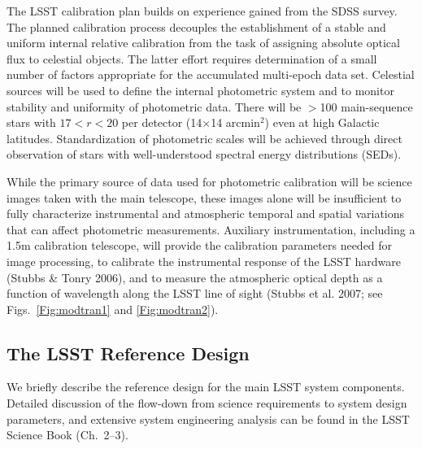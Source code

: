 \documentclass{emulateapj}
\begin{document}
The LSST calibration plan builds on experience gained from the SDSS survey. 
The planned calibration process decouples the establishment of a stable and uniform internal 
relative calibration from the task of assigning absolute optical flux to 
celestial objects. The latter effort requires determination of a small 
number of factors appropriate for the accumulated multi-epoch data set. 
Celestial sources will be used to define the internal photometric system and 
to monitor stability and uniformity of photometric data. There will be 
$>$100 main-sequence stars with $17<r<20$ per detector (14$\times$14 arcmin$^2$) 
even at high Galactic latitudes. Standardization of photometric scales will be 
achieved through direct observation of stars with well-understood spectral 
energy distributions (SEDs). 

While the primary source of data used for photometric calibration will be 
science images taken with the main telescope, these images alone will be 
insufficient to fully characterize instrumental and atmospheric temporal and 
spatial variations that can affect photometric measurements. Auxiliary 
instrumentation, including a 1.5m calibration telescope, will provide the 
calibration parameters needed for image 
processing, to calibrate the instrumental response of the LSST hardware
(Stubbs \& Tonry 2006), and to measure the atmospheric optical depth as 
a function of wavelength along the LSST line of sight (Stubbs et al. 2007; 
see Figs.~\ref{Fig:modtran1} and \ref{Fig:modtran2}). 


\subsection{     The LSST  Reference Design    }

We briefly describe the reference design for the main LSST system components. 
Detailed discussion of the flow-down from science requirements to system 
design parameters, and extensive system engineering analysis can be 
found in the LSST Science Book (Ch.~2--3). 
\end{document}
